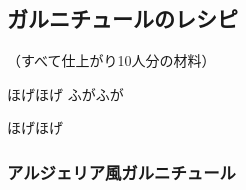 \hypertarget{garnitures-recettes}{%
\subsection{ガルニチュールのレシピ}\label{garnitures-recettes}}


\begin{center}
（すべて仕上がり10人分の材料）
\end{center}

ほげほげ ふがふが

ほげほげ
\begin{recette}
\hypertarget{ux30a2ux30ebux30b8ux30a7ux30eaux30a2ux98a8ux30acux30ebux30cbux30c1ux30e5ux30fcux30eb}{%
\subsubsection{アルジェリア風ガルニチュール}\label{ux30a2ux30ebux30b8ux30a7ux30eaux30a2ux98a8ux30acux30ebux30cbux30c1ux30e5ux30fcux30eb}}
\end{recette}